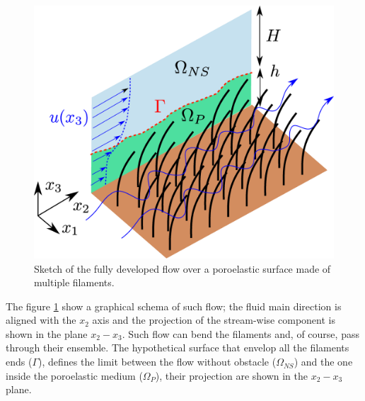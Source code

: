 \begin{figure}[h]
	\centering
	\includegraphics[width=0.7\linewidth]{chapter_1/problem_schema}
	\caption{Sketch of the fully developed flow over a poroelastic surface made of multiple filaments.}
	\label{fig:schema_problem}
\end{figure}

The figure \ref{fig:schema_problem} show a graphical schema of such flow; the fluid main direction is aligned with the $x_2$ axis and the projection of the stream-wise component is shown in the plane $x_2 - x_3$.
Such flow can bend the filaments and, of course, pass through their ensemble.
The hypothetical surface that envelop all the filaments ends ($\Gamma$), defines the limit between the flow without obstacle ($\Omega_{NS}$) and the one inside the poroelastic medium ($\Omega_{P}$), their projection are shown in the  $x_2 - x_3$ plane.

